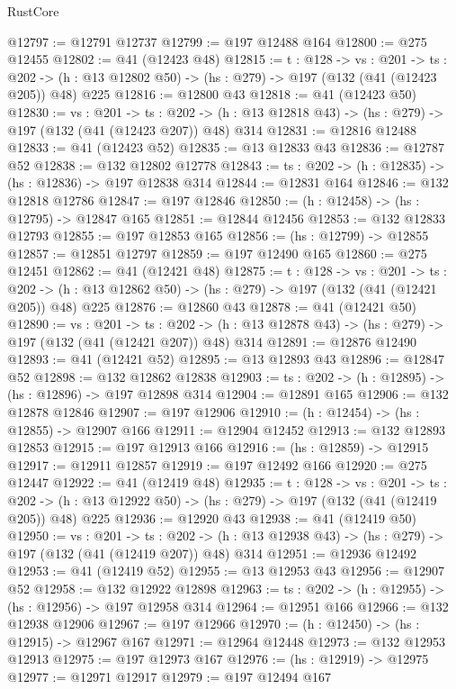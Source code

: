 \begin{lexlean}{RustCore}
\begin{coremodule}
@12797 := @12791 @12737
@12799 := @197 @12488 @164
@12800 := @275 @12455
@12802 := @41 (@12423 @48)
@12815 := {t : @128} ->
  {vs : @201} ->
  {ts : @202} -> (h : @13 @12802 @50) -> (hs : @279) -> @197 (@132 (@41 (@12423 @205)) @48) @225
@12816 := @12800 @43
@12818 := @41 (@12423 @50)
@12830 := {vs : @201} ->
  {ts : @202} -> (h : @13 @12818 @43) -> (hs : @279) -> @197 (@132 (@41 (@12423 @207)) @48) @314
@12831 := @12816 @12488
@12833 := @41 (@12423 @52)
@12835 := @13 @12833 @43
@12836 := @12787 @52
@12838 := @132 @12802 @12778
@12843 := {ts : @202} -> (h : @12835) -> (hs : @12836) -> @197 @12838 @314
@12844 := @12831 @164
@12846 := @132 @12818 @12786
@12847 := @197 @12846
@12850 := (h : @12458) -> (hs : @12795) -> @12847 @165
@12851 := @12844 @12456
@12853 := @132 @12833 @12793
@12855 := @197 @12853 @165
@12856 := (hs : @12799) -> @12855
@12857 := @12851 @12797
@12859 := @197 @12490 @165
@12860 := @275 @12451
@12862 := @41 (@12421 @48)
@12875 := {t : @128} ->
  {vs : @201} ->
  {ts : @202} -> (h : @13 @12862 @50) -> (hs : @279) -> @197 (@132 (@41 (@12421 @205)) @48) @225
@12876 := @12860 @43
@12878 := @41 (@12421 @50)
@12890 := {vs : @201} ->
  {ts : @202} -> (h : @13 @12878 @43) -> (hs : @279) -> @197 (@132 (@41 (@12421 @207)) @48) @314
@12891 := @12876 @12490
@12893 := @41 (@12421 @52)
@12895 := @13 @12893 @43
@12896 := @12847 @52
@12898 := @132 @12862 @12838
@12903 := {ts : @202} -> (h : @12895) -> (hs : @12896) -> @197 @12898 @314
@12904 := @12891 @165
@12906 := @132 @12878 @12846
@12907 := @197 @12906
@12910 := (h : @12454) -> (hs : @12855) -> @12907 @166
@12911 := @12904 @12452
@12913 := @132 @12893 @12853
@12915 := @197 @12913 @166
@12916 := (hs : @12859) -> @12915
@12917 := @12911 @12857
@12919 := @197 @12492 @166
@12920 := @275 @12447
@12922 := @41 (@12419 @48)
@12935 := {t : @128} ->
  {vs : @201} ->
  {ts : @202} -> (h : @13 @12922 @50) -> (hs : @279) -> @197 (@132 (@41 (@12419 @205)) @48) @225
@12936 := @12920 @43
@12938 := @41 (@12419 @50)
@12950 := {vs : @201} ->
  {ts : @202} -> (h : @13 @12938 @43) -> (hs : @279) -> @197 (@132 (@41 (@12419 @207)) @48) @314
@12951 := @12936 @12492
@12953 := @41 (@12419 @52)
@12955 := @13 @12953 @43
@12956 := @12907 @52
@12958 := @132 @12922 @12898
@12963 := {ts : @202} -> (h : @12955) -> (hs : @12956) -> @197 @12958 @314
@12964 := @12951 @166
@12966 := @132 @12938 @12906
@12967 := @197 @12966
@12970 := (h : @12450) -> (hs : @12915) -> @12967 @167
@12971 := @12964 @12448
@12973 := @132 @12953 @12913
@12975 := @197 @12973 @167
@12976 := (hs : @12919) -> @12975
@12977 := @12971 @12917
@12979 := @197 @12494 @167

\end{coremodule}
\end{lexlean}
